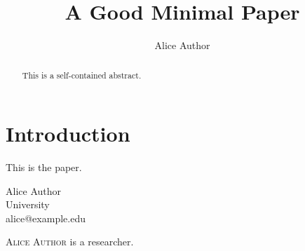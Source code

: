 \documentclass{toc}
\begin{document}
\begin{frontmatter}
\title{A Good Minimal Paper}
\author[author]{Alice Author}
\begin{abstract}
This is a self-contained abstract.
\end{abstract}
\end{frontmatter}

\section{Introduction}
This is the paper.




\begin{tocauthors}
\begin{tocinfo}[author]
Alice Author\\
University\\
alice@example.edu
\end{tocinfo}
\end{tocauthors}

\begin{tocaboutauthors}
\begin{tocabout}[author]
\textsc{Alice Author} is a researcher.
\end{tocabout}
\end{tocaboutauthors}
\end{document}
